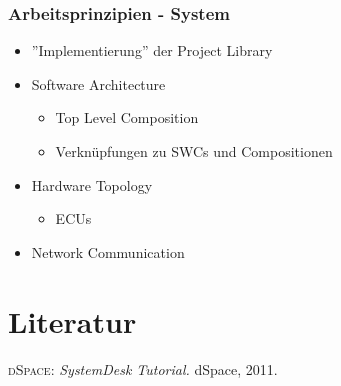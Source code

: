 \documentclass[]{beamer}
\begin{document}
\begin{frame}
\frametitle{Arbeitsprinzipien - System}
    \begin{itemize}
    \item ”Implementierung” der Project Library
    \item Software Architecture
        \begin{itemize}
            \item Top Level Composition
            \item Verknüpfungen zu SWCs und Compositionen
        \end{itemize}
    \item Hardware Topology
        \begin{itemize}
            \item ECUs
        \end{itemize}
    \item Network Communication
    \end{itemize}

\end{frame}



\appendix
\section*{Literatur}
\label{sec:Literatur}

\begin{frame}
\begin{thebibliography}{10}

 \textsc{dSpace}: {\em SystemDesk Tutorial.} dSpace, 2011.

\end{thebibliography}
\end{frame}
\end{document}

